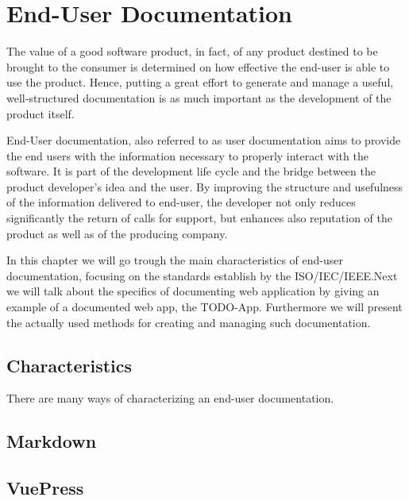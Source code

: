 \chapter{End-User Documentation}\label{ch:userDoc}
The value of a good software product, in fact, of any product destined to be brought to the consumer is determined on how effective the end-user is able to use the product. Hence, putting a great effort to generate and manage a useful, well-structured documentation is as much important as the development of the product itself.

End-User documentation, also referred to as user documentation aims to provide the end users with the information necessary to properly interact with the software. It is part of the development life cycle and the bridge between the product developer's idea and the user. By improving the structure and usefulness of the information delivered to end-user, the developer not only reduces significantly the return of calls for support, but enhances also reputation of the product as well as of the producing company\cite{8584518}.

In this chapter we will go trough the main characteristics of end-user documentation, focusing on the standards establish by the ISO/IEC/IEEE.\@ Next we will talk about the specifics of documenting web application by giving an example of a documented web app, the TODO-App. Furthermore we will present the actually used methods for creating and managing such documentation.

\section{Characteristics}\label{sec:char}
There are many ways of characterizing an end-user documentation.
\section{Markdown}\label{sec:MD}
\section{VuePress}\label{sec:VP}